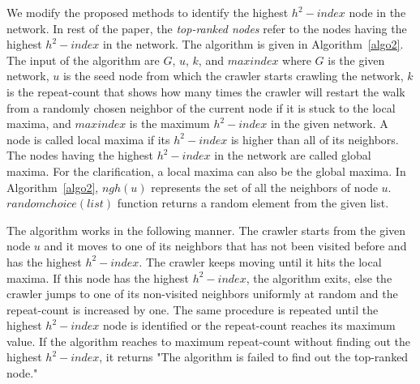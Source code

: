 \documentclass[12pt,3p]{article}
\begin{document}
We modify the proposed methods to identify the highest $h^2-index$ node in the network. In rest of the paper, the \textit{top-ranked nodes} refer to the nodes having the highest $h^2-index$ in the network. The algorithm is given in Algorithm~\ref{algo2}. The input of the algorithm are $G$, $u$, $k$, and $maxindex$ where $G$ is the given network, $u$ is the seed node from which the crawler starts crawling the network, $k$ is the repeat-count that shows how many times the crawler will restart the walk from a randomly chosen neighbor of the current node if it is stuck to the local maxima, and $maxindex$ is the maximum $h^2-index$ in the given network. A node is called local maxima if its $h^2-index$ is higher than all of its neighbors. The nodes having the highest $h^2-index$ in the network are called global maxima. For the clarification, a local maxima can also be the global maxima. In Algorithm~\ref{algo2}, $ngh(u)$ represents the set of all the neighbors of node $u$. $randomchoice(list)$ function returns a random element from the given list. 

The algorithm works in the following manner. 
The crawler starts from the given node $u$ and it moves to one of its neighbors that has not been visited before and has the highest $h^2-index$. The crawler keeps moving until it hits the local maxima. If this node has the highest $h^2-index$, the algorithm exits, else the crawler jumps to one of its non-visited neighbors uniformly at random and the repeat-count is increased by one. The same procedure is repeated until the highest $h^2-index$ node is identified or the repeat-count reaches its maximum value. If the algorithm reaches to maximum repeat-count without finding out the highest $h^2-index$, it returns "The algorithm is failed to find out the top-ranked node."  %
\end{document}
